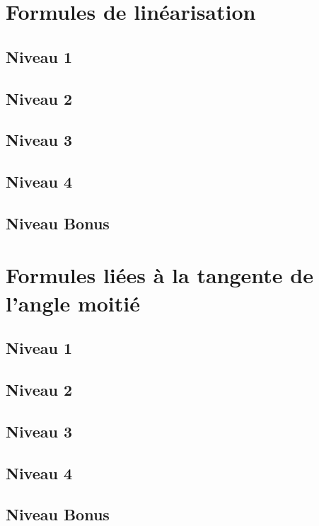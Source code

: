 \documentclass[a4paper]{report}
\begin{document}
		\section{Formules de linéarisation}
		
			\subsection{Niveau 1}
		
			\subsection{Niveau 2}
		
			\subsection{Niveau 3}
			
			\subsection{Niveau 4}
			
			\subsection{Niveau Bonus}
		
		\section{Formules liées à la tangente de l'angle moitié}
		
			\subsection{Niveau 1}
		
			\subsection{Niveau 2}
		
			\subsection{Niveau 3}
			
			\subsection{Niveau 4}
			
			\subsection{Niveau Bonus}
		
\end{document}
